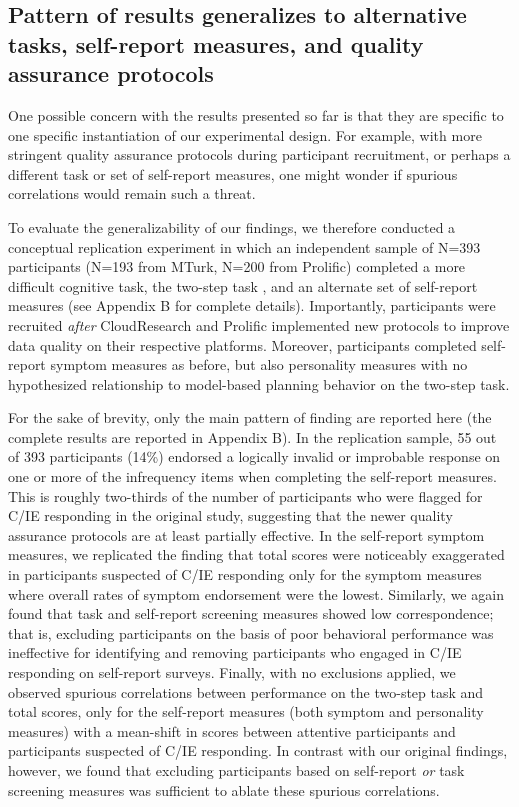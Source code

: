 \documentclass[a4paper,notitlepage,12pt]{article}
\begin{document}
\begin{refsection}[main]
\subsection{Pattern of results generalizes to alternative tasks, self-report measures, and quality assurance protocols}

One possible concern with the results presented so far is that they are specific to one specific instantiation of our experimental design. For example, with more stringent quality assurance protocols during participant recruitment, or perhaps a different task or set of self-report measures, one might wonder if spurious correlations would remain such a threat.

To evaluate the generalizability of our findings, we therefore conducted a conceptual replication experiment in which an independent sample of N=393 participants (N=193 from MTurk, N=200 from Prolific) completed a more difficult cognitive task, the two-step task \cite{daw2011model}, and an alternate set of self-report measures (see Appendix B for complete details). Importantly, participants were recruited \textit{after} CloudResearch and Prolific implemented new protocols to improve data quality on their respective platforms. Moreover, participants completed self-report symptom measures as before, but also personality measures with no hypothesized relationship to model-based planning behavior on the two-step task. 

For the sake of brevity, only the main pattern of finding are reported here (the complete results are reported in Appendix B). In the replication sample, 55 out of 393 participants (14\%) endorsed a logically invalid or improbable response on one or more of the infrequency items when completing the self-report measures. This is roughly two-thirds of the number of participants who were flagged for C/IE responding in the original study, suggesting that the newer quality assurance protocols are at least partially effective. In the self-report symptom measures, we replicated the finding that total scores were noticeably exaggerated in participants suspected of C/IE responding only for the symptom measures where overall rates of symptom endorsement were the lowest. Similarly, we again found that task and self-report screening measures showed low correspondence; that is, excluding participants on the basis of poor behavioral performance was ineffective for identifying and removing participants who engaged in C/IE responding on self-report surveys. Finally, with no exclusions applied, we observed spurious correlations between performance on the two-step task and total scores, only for the self-report measures (both symptom and personality measures) with a mean-shift in scores between attentive participants and participants suspected of C/IE responding. In contrast with our original findings, however, we found that excluding participants based on self-report \textit{or} task screening measures was sufficient to ablate these spurious correlations. 


\end{refsection}
\end{document}
